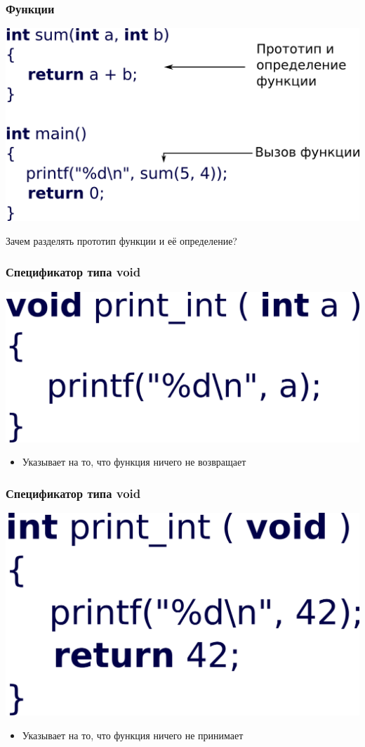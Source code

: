 \documentclass[12pt,pdf,hyperref={unicode}]{beamer}
\begin{document}
\begin{frame}[fragile]
\frametitle{Функции} 
\begin{center}
\includegraphics[width=0.8\linewidth]{images/function_summary2.png}

Зачем разделять прототип функции и её определение?
\end{center}
\end{frame}


\begin{frame}[fragile]
\frametitle{Спецификатор типа void} 
\begin{center}
\includegraphics[width=0.45\linewidth]{images/function_void.png}
\end{center}
\begin{itemize}
\item Указывает на то, что функция ничего не возвращает
\end{itemize}
\end{frame}

\begin{frame}[fragile]
\frametitle{Спецификатор типа void} 
\begin{center}
\includegraphics[width=0.45\linewidth]{images/function_void2.png}
\end{center}
\begin{itemize}
\item Указывает на то, что функция ничего не принимает
\end{itemize}
\end{frame}
\end{document}
